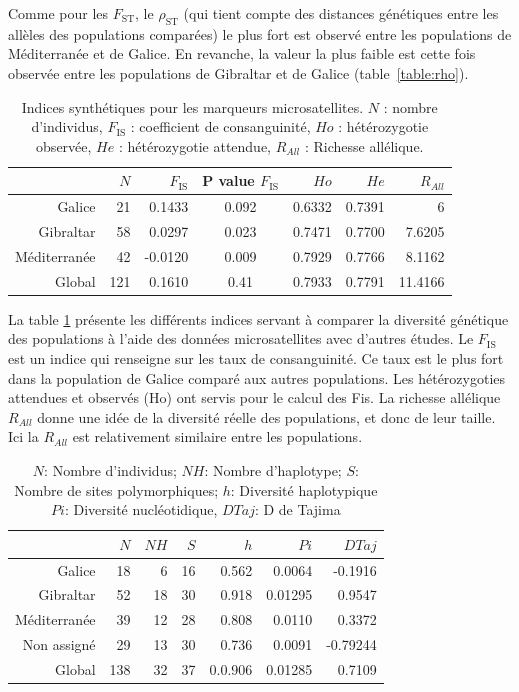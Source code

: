\documentclass[a4paper,12pt,twoside]{article}\usepackage[]{graphicx}\usepackage[]{color}
\begin{document}
Comme pour les $F_\textrm{ST}$, le $\rho_\textrm{ST}$ (qui tient compte des distances génétiques entre les allèles des populations comparées) le plus fort est observé entre les populations de Méditerranée et de Galice. En revanche, la valeur la plus faible est cette fois observée entre les populations de Gibraltar et de Galice (table~\ref{table:rho}).

\begin{table}[htpb]
\centering
\caption[Indices synthétiques pour les marqueurs microsatellites.\label{micro}]{Indices synthétiques pour les marqueurs microsatellites. $N$ : nombre d'individus, $F_\textrm{IS}$ : coefficient de consanguinité, $Ho$ : hétérozygotie observée, $He$ : hétérozygotie attendue, $R_{All}$ : Richesse allélique.}
\label{micro}
\begin{tabular}{rrrcrrr}
\toprule
 & $N$ & $F_\textrm{IS}$ & P value $F_\textrm{IS}$  & $Ho$ & $He$ & $R_{All}$ \\
\hline
Galice 			&	21	&	0.1433	& 0.092 &	0.6332	&	0.7391	&	6 \\
Gibraltar 		&	58	&	0.0297	& 0.023 &	0.7471	&	0.7700	&	7.6205\\
Méditerranée 	&	42	&	-0.0120	& 0.009 &	0.7929	&	0.7766	&	8.1162 \\
\midrule
Global 			&	121	&	0.1610	& 0.41 &	0.7933	&	0.7791	&	11.4166 \\
\bottomrule
\end{tabular}
\end{table}

La table \ref{micro} présente les différents indices servant à comparer la diversité génétique des populations à l'aide des données microsatellites avec d'autres études. Le $F_\textrm{IS}$ est un indice qui renseigne sur les taux de consanguinité. Ce taux est le plus fort dans la population de Galice comparé aux autres populations. Les hétérozygoties attendues et observés (Ho) ont servis pour le calcul des Fis. La richesse allélique $R_{All}$ donne une idée de la diversité réelle des populations, et donc de leur taille. Ici la $R_{All}$ est relativement similaire entre les populations.

\begin{table}[!]
\centering
\caption[Table des indices génétiques pour les ADN mitochondriaux \label{mito}]{$N$: Nombre d'individus; $NH$: Nombre d'haplotype; $S$: Nombre de sites polymorphiques; $h$: Diversité haplotypique $Pi$: Diversité nucléotidique, $D Taj$: D de Tajima}
\label{mito}
\begin{tabular}{rrrrrrr}
\toprule
 & $N$	&	$NH$	&	$S$	&	$h$	&	$Pi$	& $D Taj$\\
\hline
Galice &	18	&	6	&	16	&	0.562	&	0.0064 & -0.1916	\\
Gibraltar &	52	&	18	&	30	&	0.918	&	0.01295 & 0.9547	\\
Méditerranée &	39	&	12	&	28	&	0.808	&	0.0110	& 0.3372 \\
Non assigné	&	29	&	13	&	30	&	0.736	&	0.0091	& -0.79244	\\
\midrule
Global &	138	&	32	&	37	&	0.0.906	&	0.01285 & 0.7109	\\
\bottomrule
\end{tabular}
\end{table}
\end{document}
